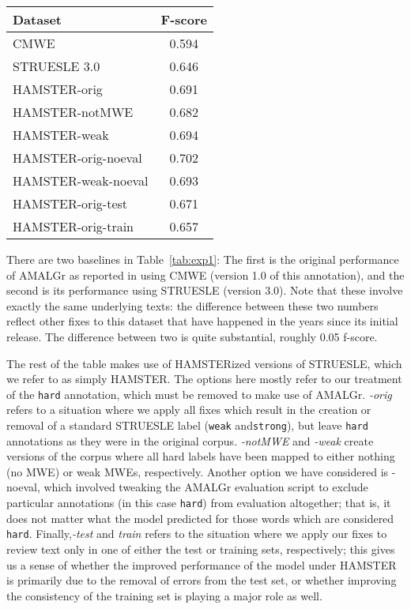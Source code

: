 \documentclass[output=paper
,modfonts
,nonflat]{langsci/langscibook}
\newcommand{\mwetype}[1]{\texttt{#1}\xspace}
\newcommand{\strongish}{\mwetype{strong}}
\newcommand{\weak}{\mwetype{weak}}
\newcommand{\hard}{\mwetype{hard}}
\newcommand{\tableref}[1]{Table~\ref{#1}\xspace}
\begin{document}
\begin{table*}[t!]
\begin{tabular}{l c}
\toprule
\textbf{Dataset}&\textbf{F-score}\\
\midrule
CMWE \citep{Schneider14b} & 0.594\\
STRUESLE 3.0 & 0.646 \\
\midrule
HAMSTER-orig & 0.691 \\ 
HAMSTER-notMWE & 0.682 \\
HAMSTER-weak & 0.694 \\
HAMSTER-orig-noeval & 0.702 \\
HAMSTER-weak-noeval & 0.693\\
HAMSTER-orig-test & 0.671\\
HAMSTER-orig-train  & 0.657 \\

\bottomrule
\end{tabular}%
\caption{AMALGr F-scores for various versions of MWE annotation of EWT Reviews} %
\label{tab:exp1} %
\end{table*}

There are two baselines in \tableref{tab:exp1}: The first is the original performance of AMALGr as reported in \citet{Schneider14b} using CMWE (version 1.0 of this annotation), and the second is its performance using STRUESLE (version 3.0). Note that these involve exactly the same underlying texts: the difference between these two numbers reflect other fixes to this dataset that have happened in the years since its initial release. The difference between two is quite substantial, roughly 0.05 f-score.

The rest of the table makes use of HAMSTERized versions of STRUESLE, which we refer to as simply HAMSTER. The options here mostly refer to our treatment of the \hard annotation, which must be removed to make use of AMALGr. \emph{-orig} refers to a situation where we apply all fixes which result in the creation or removal of a standard STRUESLE label (\ie \weak and\strongish), but leave \hard annotations as they were in the original corpus. \emph{-notMWE} and \emph{-weak} create versions of the corpus where all hard labels have been mapped to either nothing (no MWE) or weak MWEs, respectively. Another option we have considered is -noeval, which involved tweaking the AMALGr evaluation script to exclude particular annotations (in this case \hard) from evaluation altogether; that is, it does not matter what the model predicted for those words which are considered \hard. Finally,\emph{-test} and \emph{train} refers to the situation where we apply our fixes to review text only in one of either the test or training sets, respectively; this gives us a sense of whether the improved performance of the model under HAMSTER is primarily due to the removal of errors from the test set, or whether improving the consistency of the training set is playing a major role as well.
\end{document}
